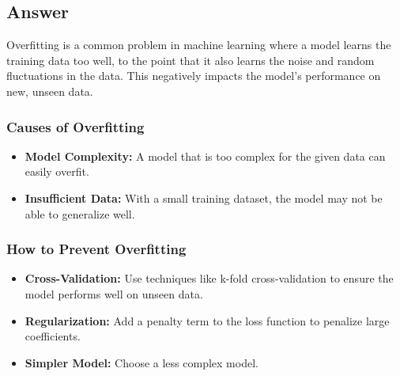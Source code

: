 
\subsection*{Answer}

Overfitting is a common problem in machine learning where a model learns the training data too well, to the point that it also learns the noise and random fluctuations in the data. This negatively impacts the model's performance on new, unseen data.

\subsubsection*{Causes of Overfitting}
\begin{itemize}
    \item \textbf{Model Complexity:} A model that is too complex for the given data can easily overfit.
    \item \textbf{Insufficient Data:} With a small training dataset, the model may not be able to generalize well.
\end{itemize}

\subsubsection*{How to Prevent Overfitting}
\begin{itemize}
    \item \textbf{Cross-Validation:} Use techniques like k-fold cross-validation to ensure the model performs well on unseen data.
    \item \textbf{Regularization:} Add a penalty term to the loss function to penalize large coefficients.
    \item \textbf{Simpler Model:} Choose a less complex model.
\end{itemize}
